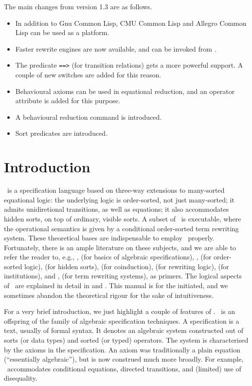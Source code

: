 \documentclass[a4paper]{memoir}
\begin{document}
The main changes from version 1.3 are as follows.
\begin{itemize}
\item In addition to Gnu Common Lisp, CMU Common Lisp and Allegro Common Lisp
  can be used as a platform.
\item Faster rewrite engines are now available, and can be invoked from
  \cafeobj.
\item The predicate \verb|==>| (for transition relations) gets a more
  powerful support. A couple of new switches are added for this reason.
\item Behavioural axioms can be used in equational reduction, and
  an operator attribute  is added for this purpose.
\item A behavioural reduction command is introduced.
\item Sort predicates are introduced.
\end{itemize}
\Hline
\clearpage
\pagestyle{headings}
\tableofcontents
\clearpage

\pagestyle{ruled}
\chapter{Introduction}

\cafeobj~is a specification language based on three-way extensions to
many-sorted equational logic: the underlying logic is
order-sorted, not just many-sorted; it admits unidiretional transitions,
as well as equations; it also accommodates hidden sorts, on top of
ordinary, visible sorts. A subset of \cafeobj~is executable, where the
operational semantics is given by a conditional order-sorted term rewriting
system. These theoretical bases are indispensable to employ \cafeobj~properly.
Fortunately, there is an ample literature on these subjects, and we are able
to refer the reader to, e.g., \cite{e-m85}, \cite{m-g82} (for basics of
algebraic specifications), \cite{osa}, \cite{osa-survey} (for order-sorted
logic), \cite{hsa} (for hidden sorts), \cite{eatcs-coalg} (for coinduction),
\cite{rew-logic} (for rewriting
logic), \cite{institution} (for institutions), and \cite{trs-eatcs},
\cite{trs-handbook} (for term rewriting systems), as primers.
The logical aspects of \cafeobj~are explained in detail in \cite{razvan96-1}
and \cite{cafeobj-rep}. This manual is for the initiated, and we sometimes
abandon the theoretical rigour for the sake of intuitiveness.

For a very brief introduction, we just highlight a couple of features
of \cafeobj. \cafeobj~is an offspring of the family of algebraic
specification techniques. A specification is a text, usually of
formal syntax. It denotes an algebraic system constructed out of
sorts (or data types) and sorted (or typed) operators. The system
is characterised by the axioms in the specification. An axiom was
traditionally a plain equation (``essentially algebraic''), but is now
construed much more broadly. For example, \cafeobj~accommodates
conditional equations, directed transitions, and (limited) use of
disequality.
\end{document}
